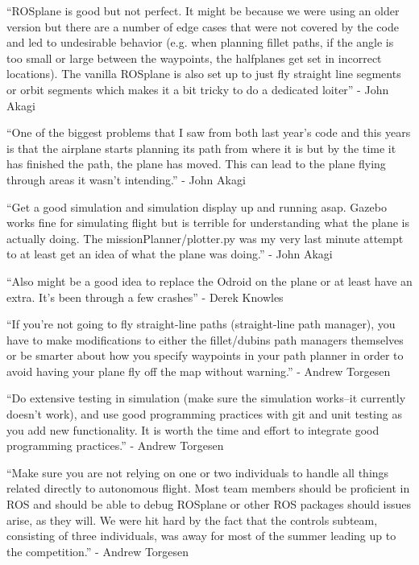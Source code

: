 \documentclass[]{auvsi_doc}
\begin{document}
{}

{``ROSplane is good but not perfect. It might be because we were using
an older version but there are a number of edge cases that were not
covered by the code and led to undesirable behavior (e.g. when planning
fillet paths, if the angle is too small or large between the waypoints,
the halfplanes get set in incorrect locations). The vanilla ROSplane is
also set up to just fly straight line segments or orbit segments which
makes it a bit tricky to do a dedicated loiter'' - John Akagi}

{}

{``One of the biggest problems that I saw from both last year's code and
this years is that the airplane starts planning its path from where it
is but by the time it has finished the path, the plane has moved. This
can lead to the plane flying through areas it wasn't intending.'' - John
Akagi}

{}

{``Get a good simulation and simulation display up and running asap.
Gazebo works fine for simulating flight but is terrible for
understanding what the plane is actually doing. The
missionPlanner/plotter.py was my very last minute attempt to at least
get an idea of what the plane was doing.'' - John Akagi}

{}

{``Also might be a good idea to replace the Odroid on the plane or at
least have an extra. It's been through a few crashes'' - Derek Knowles}

{}

{``If you're not going to fly straight-line paths (straight-line path
manager), you have to make modifications to either the fillet/dubins
path managers themselves or be smarter about how you specify waypoints
in your path planner in order to avoid having your plane fly off the map
without warning.'' - Andrew Torgesen}

{}

{``Do extensive testing in simulation (make sure the simulation
works--it currently doesn't work), and use good programming practices
with git and unit testing as you add new functionality. It is worth the
time and effort to integrate good programming practices.'' - Andrew
Torgesen}

{}

{``Make sure you are not relying on one or two individuals to handle all
things related directly to autonomous flight. Most team members should
be proficient in ROS }{and should be able to debug ROSplane or other ROS
packages should issues arise}{, as they will. We were hit hard by the
fact that the controls subteam, consisting of three individuals, was
away for most of the summer leading up to the competition.'' - Andrew
Torgesen}
\end{document}

